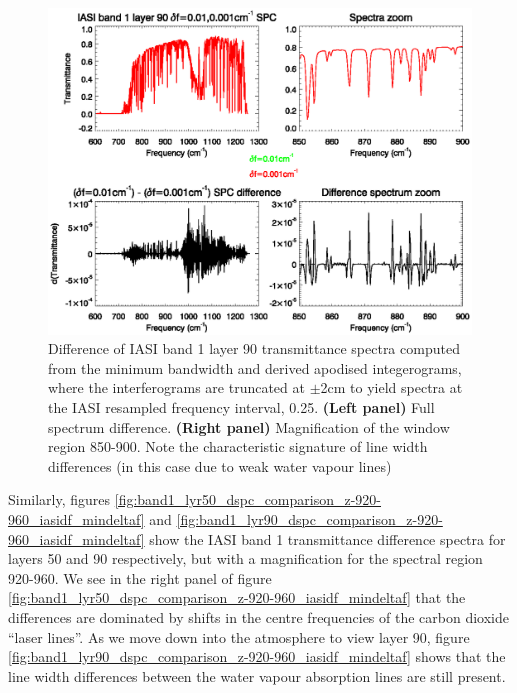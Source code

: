 \begin{figure}[htp]
  \centering
  \includegraphics[bb=70 230 540 390,clip,scale=0.8]{graphics/band1_lyr90_dspc_comparison_z-850-900_iasidf_mindeltaf.eps}
  \caption{Difference of IASI band 1 layer 90 transmittance spectra computed from the minimum bandwidth  and  derived apodised integerograms, where the interferograms are truncated at $\pm$2cm to yield spectra at the IASI resampled frequency interval, 0.25\invcm. \textbf{(Left panel)} Full spectrum difference. \textbf{(Right panel)} Magnification of the window region 850-900\invcm. Note the characteristic signature of line width differences (in this case due to weak water vapour lines)}
  \label{fig:band1_lyr90_dspc_comparison_z-850-900_iasidf_mindeltaf}
\end{figure}

Similarly, figures \ref{fig:band1_lyr50_dspc_comparison_z-920-960_iasidf_mindeltaf} and \ref{fig:band1_lyr90_dspc_comparison_z-920-960_iasidf_mindeltaf} show the IASI band 1 transmittance difference spectra for layers 50 and 90 respectively, but with a magnification for the spectral region 920-960\invcm. We see in the right panel of figure  \ref{fig:band1_lyr50_dspc_comparison_z-920-960_iasidf_mindeltaf} that the differences are dominated by shifts in the centre frequencies of the carbon dioxide ``laser lines''. As we move down into the atmosphere to view layer 90, figure \ref{fig:band1_lyr90_dspc_comparison_z-920-960_iasidf_mindeltaf} shows that the line width differences between the water vapour absorption lines are still present.

